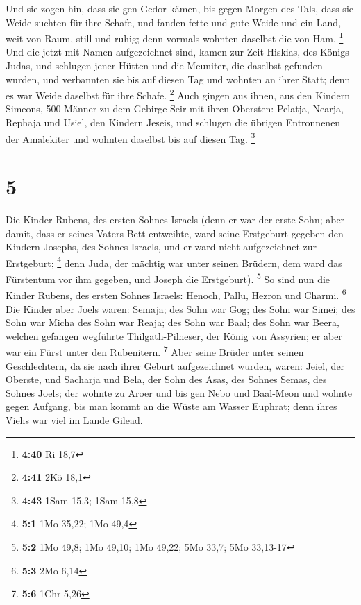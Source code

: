  Und sie zogen hin, dass sie gen Gedor kämen, bis gegen
Morgen des Tals, dass sie Weide suchten für ihre Schafe, 
und fanden fette und gute Weide und ein Land, weit von Raum, still und
ruhig; denn vormals wohnten daselbst die von Ham. \footnote{\textbf{4:40}
  Ri 18,7}  Und die jetzt mit Namen aufgezeichnet sind,
kamen zur Zeit Hiskias, des Königs Judas, und schlugen jener Hütten und
die Meuniter, die daselbst gefunden wurden, und verbannten sie bis auf
diesen Tag und wohnten an ihrer Statt; denn es war Weide daselbst für
ihre Schafe. \footnote{\textbf{4:41} 2Kö 18,1}  Auch gingen
aus ihnen, aus den Kindern Simeons, 500 Männer zu dem Gebirge Seir mit
ihren Obersten: Pelatja, Nearja, Rephaja und Usiel, den Kindern Jeseis,
 und schlugen die übrigen Entronnenen der Amalekiter und
wohnten daselbst bis auf diesen Tag. \footnote{\textbf{4:43} 1Sam 15,3;
  1Sam 15,8}

\hypertarget{section-2}{%
\section{5}\label{section-2}}

 Die Kinder Rubens, des ersten Sohnes Israels (denn er war
der erste Sohn; aber damit, dass er seines Vaters Bett entweihte, ward
seine Erstgeburt gegeben den Kindern Josephs, des Sohnes Israels, und er
ward nicht aufgezeichnet zur Erstgeburt; \footnote{\textbf{5:1} 1Mo
  35,22; 1Mo 49,4}  denn Juda, der mächtig war unter seinen
Brüdern, dem ward das Fürstentum vor ihm gegeben, und Joseph die
Erstgeburt). \footnote{\textbf{5:2} 1Mo 49,8; 1Mo 49,10; 1Mo 49,22; 5Mo
  33,7; 5Mo 33,13-17}  So sind nun die Kinder Rubens, des
ersten Sohnes Israels: Henoch, Pallu, Hezron und Charmi. \footnote{\textbf{5:3}
  2Mo 6,14}  Die Kinder aber Joels waren: Semaja; des Sohn
war Gog; des Sohn war Simei;  des Sohn war Micha des Sohn
war Reaja; des Sohn war Baal;  des Sohn war Beera, welchen
gefangen wegführte Thilgath-Pilneser, der König von Assyrien; er aber
war ein Fürst unter den Rubenitern. \footnote{\textbf{5:6} 1Chr 5,26}
 Aber seine Brüder unter seinen Geschlechtern, da sie nach
ihrer Geburt aufgezeichnet wurden, waren: Jeiel, der Oberste, und
Sacharja  und Bela, der Sohn des Asas, des Sohnes Semas, des
Sohnes Joels; der wohnte zu Aroer und bis gen Nebo und Baal-Meon
 und wohnte gegen Aufgang, bis man kommt an die Wüste am
Wasser Euphrat; denn ihres Viehs war viel im Lande Gilead.

